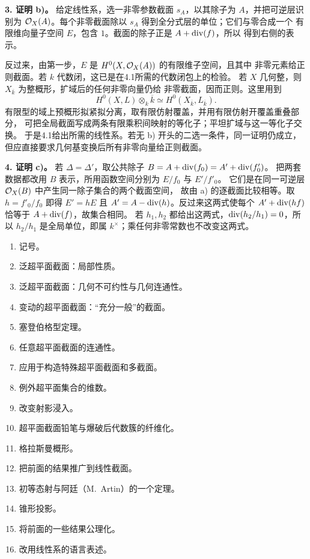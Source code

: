 \medskip\noindent\textbf{3. 证明 b)。}
给定线性系，选一非零参数截面 \(s_A\)，以其除子为 \(A\)，并把可逆层识别为
\(\mathcal O_X(A)\)。每个非零截面除以 \(s_A\) 得到全分式层的单位；它们与零合成一个
有限维向量子空间 \(E\)，包含 \(1\)。截面的除子正是 \(A+\operatorname{div}(f)\)，所以
得到右侧的表示。

反过来，由第一步，\(E\) 是 \(H^0(X,\mathcal O_X(A))\) 的有限维子空间，且其中
非零元素给正则截面。若 \(k\) 代数闭，这已是在4.1所需的代数闭包上的检验。
若 \(X\) 几何整，则 \(X_{\overline k}\) 为整概形，扩域后的任何非零向量仍给
非零截面，因而正则。这里用到
\[
 H^0(X,L)\otimes_k\overline k\simeq H^0(X_{\overline k},L_{\overline k}).
\]
有限型的域上预概形拟紧拟分离，取有限仿射覆盖，并用有限仿射开覆盖重叠部分，
可把全局截面写成两条有限乘积间映射的等化子；平坦扩域与这一等化子交换。
于是4.1给出所需的线性系。若无 b) 开头的二选一条件，同一证明仍成立，
但应直接要求几何基变换后所有非零向量给正则截面。

\medskip\noindent\textbf{4. 证明 c)。}
若 \(\Delta=\Delta'\)，取公共除子 \(B=A+\operatorname{div}(f_0)=A'+\operatorname{div}(f'_0)\)。
把两套数据都改用 \(B\) 表示，所用函数空间分别为 \(E/f_0\) 与 \(E'/f'_0\)。
它们是在同一可逆层 \(\mathcal O_X(B)\) 中产生同一除子集合的两个截面空间，
故由 a) 的逐截面比较相等。取 \(h=f'_0/f_0\) 即得
\(E'=hE\) 且 \(A'=A-\operatorname{div}(h)\)。反过来这两式使每个
\(A'+\operatorname{div}(hf)\) 恰等于 \(A+\operatorname{div}(f)\)，故集合相同。
若 \(h_1,h_2\) 都给出这两式，\(\operatorname{div}(h_2/h_1)=0\)，所以
\(h_2/h_1\) 是全局单位，即属 \(k^\times\)；乘任何非零常数也不改变这两式。
\par\endgroup

\begingroup
\def\illis{〔字迹不清〕}
\def\gap{〔扫本缺损〕}
\hypertarget{audit:L18-087}{}
\begin{enumerate}
 \item 记号。
 \item 泛超平面截面：局部性质。
 \item 泛超平面截面：几何不可约性与几何连通性。
 \item 变动的超平面截面：“充分一般”的截面。
 \item 塞登伯格型定理。
 \item 任意超平面截面的连通性。
 \item 应用于构造特殊超平面截面和多截面。
 \item 例外超平面集合的维数。
 \item 改变射影浸入。
 \item 超平面截面铅笔与爆破后代数簇的纤维化。
 \item 格拉斯曼概形。
 \item 把前面的结果推广到线性截面。
 \item 初等态射与阿廷（M.~Artin）的一个定理。
 \item 锥形投影。
 \item 将前面的一些结果公理化。
 \item 改用线性系的语言表述。
\end{enumerate}

